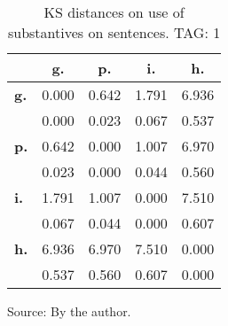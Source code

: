\begin{table}[h!]
\begin{center}
\caption{KS distances on use of substantives on sentences. TAG: 1}
	\label{tab:kolSub}
\begin{tabular}{| l || c | c | c | c |}\hline
 & {\bf g.} & {\bf p.} & {\bf i.} & {\bf h.} \\\hline\hline
{\bf g.} & 0.000 & 0.642 & 1.791 & 6.936 \\
{\bf } & 0.000 & 0.023 & 0.067 & 0.537 \\\hline
{\bf p.} & 0.642 & 0.000 & 1.007 & 6.970 \\
{\bf } & 0.023 & 0.000 & 0.044 & 0.560 \\\hline
{\bf i.} & 1.791 & 1.007 & 0.000 & 7.510 \\
{\bf } & 0.067 & 0.044 & 0.000 & 0.607 \\\hline
{\bf h.} & 6.936 & 6.970 & 7.510 & 0.000 \\
{\bf } & 0.537 & 0.560 & 0.607 & 0.000 \\\hline
\end{tabular}
\end{center}
\begin{flushleft}
		Source: By the author.\
\end{flushleft}
\end{table}
